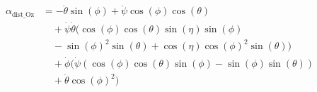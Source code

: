 \documentclass[letterpaper, 10 pt, conference]{ieeeconf}  %
\begin{document}
\begin{equation}
  \begin{aligned}
    \alpha_{\text{dist\_Oz}} & = -\ddot{\theta}\sin(\phi) + \ddot{\psi}\cos(\phi)\cos(\theta)                           \\
                             & \quad  + \dot{\psi}\dot{\theta}(\cos(\phi)\cos(\theta)\sin(\eta)\sin(\phi)               \\
                             & \quad  - \sin(\phi)^2\sin(\theta) + \cos(\eta)\cos(\phi)^2\sin(\theta))                  \\
                             & \quad + \dot{\phi}(\dot{\psi}(\cos(\phi)\cos(\theta)\sin(\phi) - \sin(\phi)\sin(\theta)) \\
                             & \quad  + \dot{\theta}\cos(\phi)^2)
  \end{aligned}
\end{equation}
\end{document}

